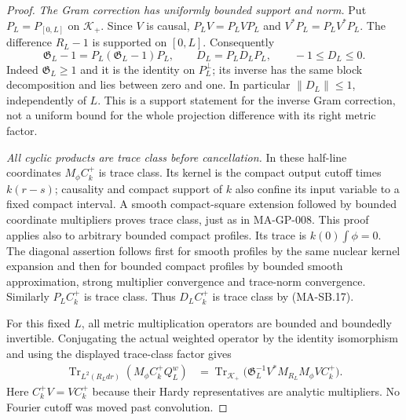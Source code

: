 \begin{proof}
\emph{The Gram correction has uniformly bounded support and norm.}
Put $P_L=P_{[0,L]}$ on $\mathcal K_+$.
Since $V$ is causal,
$P_LV=P_LVP_L$ and $V^*P_L=P_LV^*P_L$.
The difference $R_L-1$ is supported on $[0,L]$.
Consequently
\[
       \mathfrak G_L-1=P_L(\mathfrak G_L-1)P_L,\qquad
       D_L=P_LD_LP_L,\qquad -1\le D_L\le0 .
 \tag{MA-SB.17}
\]
Indeed $\mathfrak G_L\ge1$ and it is the identity
on $P_L^\perp$; its inverse has the same block
decomposition and lies between zero and one.
In particular $\|D_L\|\le1$, independently of $L$.
This is a support statement for the inverse Gram
correction, not a uniform bound for the whole
projection difference with its right metric factor.

\emph{All cyclic products are trace class before cancellation.}
In these half-line coordinates $M_\phi C_k^+$ is
trace class.  Its kernel is the compact output
cutoff times $k(r-s)$; causality and compact
support of $k$ also confine its input variable
to a fixed compact interval.
A smooth compact-square extension followed by
bounded coordinate multipliers proves trace
class, just as in MA-GP-008.
This proof applies also to arbitrary bounded compact profiles.
Its trace is $k(0)\int\phi=0$.
The diagonal assertion follows first for smooth
profiles by the same nuclear kernel expansion
and then for bounded compact profiles by bounded smooth
approximation, strong multiplier convergence and trace-norm convergence.
Similarly $P_LC_k^+$ is trace class.
Thus $D_LC_k^+$ is trace class by (MA-SB.17).

For this fixed $L$, all metric multiplication
operators are bounded and boundedly invertible.
Conjugating the actual weighted operator by
the identity isomorphism and using the displayed
trace-class factor gives
\[
 \begin{split}
 \operatorname{Tr}_{L^2(R_Ldr)}(M_\phi C_k^+Q_L^w)
 &=\operatorname{Tr}_{\mathcal K_+}
     \bigl(\mathfrak G_L^{-1}V^*M_{R_L}M_\phi VC_k^+\bigr).
 \end{split}
 \tag{MA-SB.18}
\]
Here $C_k^+V=VC_k^+$ because their Hardy
representatives are analytic multipliers.
No Fourier cutoff was moved past convolution.


\end{proof}
